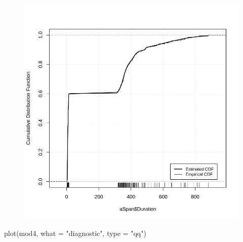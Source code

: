 \documentclass[
  letterpaper,
  DIV=11,
  numbers=noendperiod]{scrartcl}
\newenvironment{Shaded}{\begin{snugshade}}{\end{snugshade}}
\newcommand{\AttributeTok}[1]{\textcolor[rgb]{0.40,0.45,0.13}{#1}}
\newcommand{\FunctionTok}[1]{\textcolor[rgb]{0.28,0.35,0.67}{#1}}
\newcommand{\NormalTok}[1]{\textcolor[rgb]{0.00,0.23,0.31}{#1}}
\newcommand{\StringTok}[1]{\textcolor[rgb]{0.13,0.47,0.30}{#1}}
\begin{document}
\begin{figure}[H]

{\centering \includegraphics{dss-span-analysis-rev5_files/figure-pdf/cell-37-output-1.png}

}

\end{figure}

\begin{Shaded}
\begin{Highlighting}[]
\FunctionTok{plot}\NormalTok{(mod4, }\AttributeTok{what =} \StringTok{"diagnostic"}\NormalTok{, }\AttributeTok{type =} \StringTok{"qq"}\NormalTok{)}
\end{Highlighting}
\end{Shaded}
\end{document}

